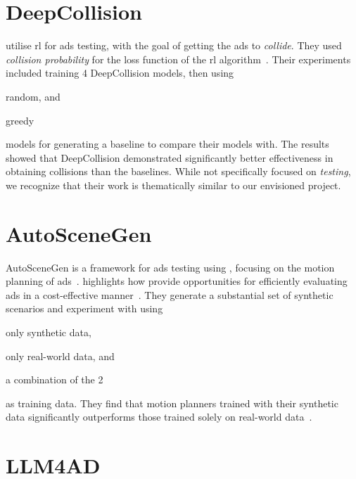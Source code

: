 \section{DeepCollision}

\citeauthor{deepCollision} utilise \acrfull{rl} for \acrshort{ads} testing, with the goal of getting
the \acrshort{ads} to \textit{collide}. They used \textit{collision probability} for the loss
function of the \acrlong{rl} algorithm~\cite[384]{deepCollision}. Their experiments included
training 4 DeepCollision models, then using \begin{inparaenum}
  \item random, and
  \item greedy
\end{inparaenum} models for generating a baseline to compare their models with. The results showed
that DeepCollision demonstrated significantly better effectiveness in obtaining collisions than the
baselines. While not specifically focused on \textit{testing}, we recognize that their work is thematically
similar to our envisioned project.

\section{AutoSceneGen}

AutoSceneGen is a framework for \acrshort{ads} testing using ,
focusing on the motion planning of \acrlong{ads}~\cite[14539]{autoSceneGen}.
\citeauthor{autoSceneGen} highlights how  provide opportunities
for efficiently evaluating \acrshort{ads} in a cost-effective
manner~\cite[14539-14540]{autoSceneGen}. They generate a substantial set of synthetic scenarios and
experiment with using \begin{inparaenum}
  \item only synthetic data,
  \item only real-world data, and
  \item a combination of the \num{2} \end{inparaenum} as training data. They find that motion
planners trained with their synthetic data significantly outperforms those trained solely on
real-world data~\cite[14539]{autoSceneGen}.

\section{LLM4AD}

